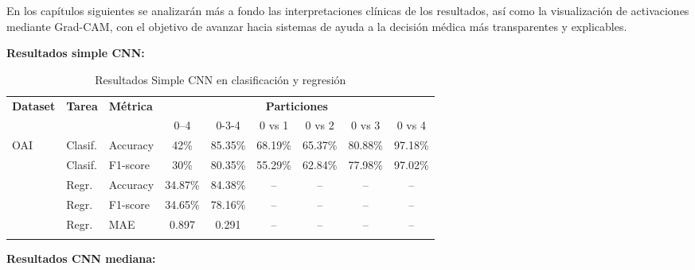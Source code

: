 \documentclass[11pt,spanish,listoffigures,listoftables]{tfgetsinf}
\begin{document}
En los capítulos siguientes se analizarán más a fondo las interpretaciones clínicas de los resultados, así como la visualización de activaciones mediante Grad-CAM, con el objetivo de avanzar hacia sistemas de ayuda a la decisión médica más transparentes y explicables.

\textbf{Resultados simple CNN:}

\begin{table}[h]
    \centering
    \caption{Resultados Simple CNN en clasificación y regresión}
    \label{tab:simple_cnn_results_improved}
    \begin{tabular}{@{} l l l c c c c c c @{}} 
      \toprule
      \textbf{Dataset} & \textbf{Tarea} & \textbf{Métrica} 
        & \multicolumn{6}{c}{\textbf{Particiones}} \\
      \cmidrule(lr){4-9}
      & & & 0--4 & 0-3-4 & 0 vs 1 & 0 vs 2 & 0 vs 3 & 0 vs 4 \\
      \midrule
      \multirow{2}{*}{OAI}
        & Clasif. & Accuracy   & 42\%   & 85.35\%   & 68.19\% &  65.37\%   &  80.88\%   &  97.18\%   \\
        & Clasif. & F1-score    & 30\%  & 80.35\%  & 55.29\%  &  62.84\%   &  77.98\%   &  97.02\%   \\
      \addlinespace
      \multirow{3}{*}{OAI}
        & Regr.   & Accuracy   & 34.87\%   & 84.38\% &  --      &  --   &  --   &  --   \\
        & Regr.   & F1-score    & 34.65\%  & 78.16\%  &  --      &  --   &  --   &  --   \\
        & Regr.   & MAE         & 0.897  & 0.291  &  --      &  --   &  --   &  --   \\
      \addlinespace
    \end{tabular}
\end{table}
  


\textbf{Resultados CNN mediana:}
\end{document}
